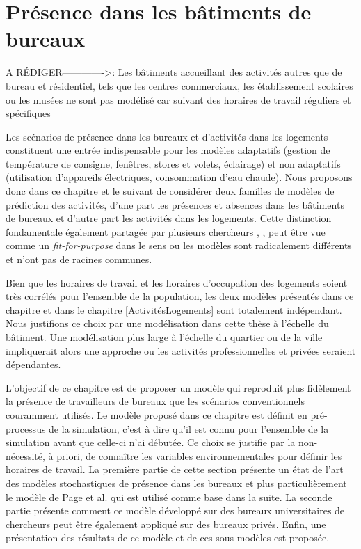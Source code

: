 \section{Présence dans les bâtiments de bureaux}

A RÉDIGER------------->: Les bâtiments accueillant des activités autres que de bureau et résidentiel, tels que les centres commerciaux, les établissement scolaires ou les musées ne sont pas modélisé car suivant des horaires de travail réguliers et spécifiques

\label{PresenceBureau}

Les scénarios de présence dans les bureaux et d'activités dans les logements constituent une entrée indispensable pour les modèles adaptatifs (gestion de température de consigne, fenêtres, stores et volets, éclairage) et non adaptatifs (utilisation d'appareils électriques, consommation d'eau chaude). Nous proposons donc dans ce chapitre et le suivant de considérer deux familles de modèles de prédiction des activités, d'une part les présences et absences dans les bâtiments de bureaux et d'autre part les activités dans les logements. Cette distinction fondamentale également partagée par plusieurs chercheurs \cite{Vorger-14}, \cite{Page-08}, \cite{Chapman-14} peut être vue comme un \textit{fit-for-purpose} dans le sens ou les modèles sont radicalement différents et n'ont pas de racines communes.

Bien que les horaires de travail et les horaires d'occupation des logements soient très corrélés pour l'ensemble de la population, les deux modèles présentés dans ce chapitre et dans le chapitre \ref{ActivitésLogements} sont totalement indépendant. Nous justifions ce choix par une modélisation dans cette thèse à l'échelle du bâtiment. Une modélisation plus large à l'échelle du quartier ou de la ville impliquerait alors une approche ou les activités professionnelles et privées seraient dépendantes.

L'objectif de ce chapitre est de proposer un modèle qui reproduit plus fidèlement la présence de travailleurs de bureaux que les scénarios conventionnels couramment utilisés. Le modèle proposé dans ce chapitre est définit en pré-processus de la simulation, c'est à dire qu'il est connu pour l'ensemble de la simulation avant que celle-ci n'ai débutée. Ce choix se justifie par la non-nécessité, à priori, de connaître les variables environnementales pour définir les horaires de travail. La première partie de cette section présente un état de l'art des modèles stochastiques de présence dans les bureaux et plus particulièrement le modèle de Page et al. \cite{Page-08} qui est utilisé comme base dans la suite. La seconde partie présente comment ce modèle développé sur des bureaux universitaires de chercheurs peut être également appliqué sur des bureaux privés. Enfin, une présentation des résultats de ce modèle et de ces sous-modèles est proposée.

